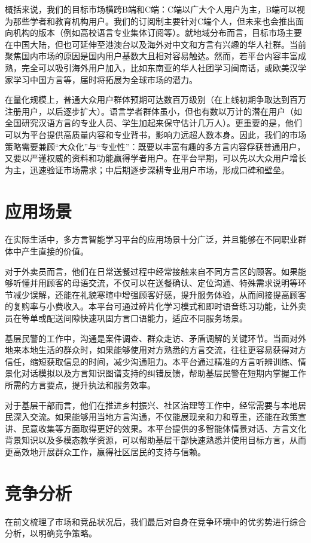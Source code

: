 概括来说，我们的目标市场横跨B端和C端：C端以广大个人用户为主，B端可以视为那些学者和教育机构用户。我们的订阅制主要针对C端个人，但未来也会推出面向机构的版本（例如高校语言专业集体订阅等）。就地域分布而言，目标市场主要在中国大陆，但也可延伸至港澳台以及海外对中文和方言有兴趣的华人社群。当前聚焦国内市场的原因是国内用户基数大且相对容易触达。然而，若平台内容丰富成熟，完全可以吸引海外用户加入，比如东南亚的华人社团学习闽南话，或欧美汉学家学习中国方言等，届时将拓展为全球市场的潜力。

在量化规模上，普通大众用户群体预期可达数百万级别（在上线初期争取达到百万注册用户，以后逐步扩大）。语言学者群体虽小，但也有数以万计的潜在用户（如全国研究汉语方言的专业人员、学生加起来保守估计几万人）。更重要的是，他们可以为平台提供高质量内容和专业背书，影响力远超人数本身。因此，我们的市场策略需要兼顾“大众化”与“专业性”：既要以丰富有趣的多方言内容俘获普通用户，又要以严谨权威的资料和功能赢得学者用户。在平台早期，可以先以大众用户增长为主，迅速验证市场需求；中后期逐步深耕专业用户市场，形成口碑和壁垒。

\section{应用场景}

在实际生活中，多方言智能学习平台的应用场景十分广泛，并且能够在不同职业群体中产生直接的价值。

对于外卖员而言，他们在日常送餐过程中经常接触来自不同方言区的顾客。如果能够听懂并用顾客的母语交流，不仅可以在送餐确认、定位沟通、特殊需求说明等环节减少误解，还能在礼貌寒暄中增强顾客好感，提升服务体验，从而间接提高顾客的复购率与小费收入。本平台可通过碎片化学习模式和即时语音练习功能，让外卖员在等单或配送间隙快速巩固方言口语能力，适应不同服务场景。

基层民警的工作中，沟通是案件调查、群众走访、矛盾调解的关键环节。当面对外地来本地生活的群众时，如果能够使用对方熟悉的方言交流，往往更容易获得对方信任，缩短获取信息的时间，减少沟通阻力。本平台通过精准的方言听辨训练、情景化对话模拟以及方言知识图谱支持的纠错反馈，帮助基层民警在短期内掌握工作所需的方言要点，提升执法和服务效率。

对于基层干部而言，他们在推进乡村振兴、社区治理等工作中，经常需要与本地居民深入交流。如果能够用当地方言沟通，不仅能展现亲和力和尊重，还能在政策宣讲、民意收集等方面取得更好的效果。本平台提供的多智能体情景对话、方言文化背景知识以及多模态教学资源，可以帮助基层干部快速熟悉并使用目标方言，从而更高效地开展群众工作，赢得社区居民的支持与信赖。

\section{竞争分析}
在前文梳理了市场和竞品状况后，我们最后对自身在竞争环境中的优劣势进行综合分析，以明确竞争策略。

